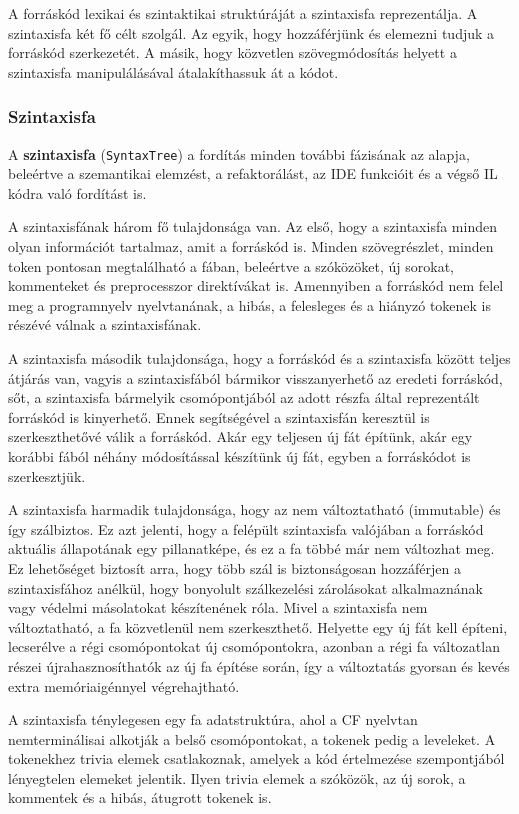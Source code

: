 \documentclass[12pt, a4paper]{report}
\newcommand{\f}[1]{\texttt{#1}}
\newcommand{\bb}[1]{\textbf{#1}}
\begin{document}
A forráskód lexikai és szintaktikai struktúráját a szintaxisfa reprezentálja. A szintaxisfa két fő célt szolgál. Az egyik, hogy hozzáférjünk és elemezni tudjuk a forráskód szerkezetét. A másik, hogy közvetlen szövegmódosítás helyett a szintaxisfa manipulálásával átalakíthassuk át a kódot.

\subsubsection{Szintaxisfa}

A \bb{szintaxisfa} (\f{SyntaxTree}) a fordítás minden további fázisának az alapja, beleértve a szemantikai elemzést, a refaktorálást, az IDE funkcióit és a végső IL kódra való fordítást is.

A szintaxisfának három fő tulajdonsága van. Az első, hogy a szintaxisfa minden olyan információt tartalmaz, amit a forráskód is. Minden szövegrészlet, minden token pontosan megtalálható a fában, beleértve a szóközöket, új sorokat, kommenteket és preprocesszor direktívákat is. Amennyiben a forráskód nem felel meg a programnyelv nyelvtanának, a hibás, a felesleges és a hiányzó tokenek is részévé válnak a szintaxisfának.

A szintaxisfa második tulajdonsága, hogy a forráskód és a szintaxisfa között teljes átjárás van, vagyis a szintaxisfából bármikor visszanyerhető az eredeti forráskód, sőt, a szintaxisfa bármelyik csomópontjából az adott részfa által reprezentált forráskód is kinyerhető. Ennek segítségével a szintaxisfán keresztül is szerkeszthetővé válik a forráskód. Akár egy teljesen új fát építünk, akár egy korábbi fából néhány módosítással készítünk új fát, egyben a forráskódot is szerkesztjük.

A szintaxisfa harmadik tulajdonsága, hogy az nem változtatható (immutable) és így szálbiztos. Ez azt jelenti, hogy a felépült szintaxisfa valójában a forráskód aktuális állapotának egy pillanatképe, és ez a fa többé már nem változhat meg. Ez lehetőséget biztosít arra, hogy több szál is biztonságosan hozzáférjen a szintaxisfához anélkül, hogy bonyolult szálkezelési zárolásokat alkalmaznának vagy védelmi másolatokat készítenének róla. Mivel a szintaxisfa nem változtatható, a fa közvetlenül nem szerkeszthető. Helyette egy új fát kell építeni, lecserélve a régi csomópontokat új csomópontokra, azonban a régi fa változatlan részei újrahasznosíthatók az új fa építése során, így a változtatás gyorsan és kevés extra memóriaigénnyel végrehajtható.

A szintaxisfa ténylegesen egy fa adatstruktúra, ahol a CF nyelvtan nemterminálisai alkotják a belső csomópontokat, a tokenek pedig a leveleket. A tokenekhez trivia elemek csatlakoznak, amelyek a kód értelmezése szempontjából lényegtelen elemeket jelentik. Ilyen trivia elemek a szóközök, az új sorok, a kommentek és a hibás, átugrott tokenek is.
\end{document}
